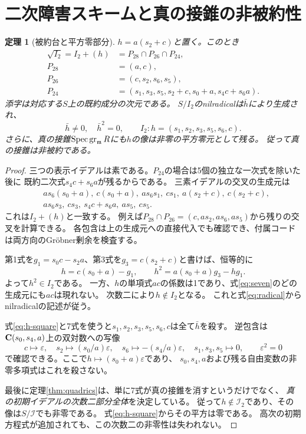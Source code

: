 \documentclass[a4paper,11pt]{ltjsarticle}
\newtheorem{theorem}{定理}[section]
\theoremstyle{remark}\newtheorem{remark}[theorem]{注意}
\newcommand{\Spec}{\operatorname{Spec}}\newcommand{\rank}{\operatorname{rank}}
\begin{document}
\section{二次障害スキームと真の接錐の非被約性}
\begin{theorem}[被約台と平方零部分]\label{thm:radical}
$h=a(s_2+c)$と置く。このとき
\begin{align}
 \sqrt{I_2}=I_2+(h)&=P_{28}\cap P_{26}\cap P_{24},\label{eq:radical}\\
 P_{28}&=(a,c),\nonumber\\
 P_{26}&=(c,s_2,s_6,s_5),\nonumber\\
 P_{24}&=(s_1,s_3,s_5,s_2+c,s_0+a,s_4c+s_6a).\nonumber
\end{align}
添字は対応する$S$上の既約成分の次元である。
$S/I_2$のnilradicalは$\bar h$により生成され、
\begin{equation}\label{eq:nil}
 \bar h\ne0,\quad\bar h^2=0,\qquad
 I_2:h=(s_1,s_2,s_3,s_5,s_6,c).
\end{equation}
さらに、\emph{真の接錐}$\Spec\gr_{\mathfrak m}R$にも$h$の像は非零の平方零元として残る。
従って真の接錐は非被約である。
\end{theorem}
\begin{proof}
三つの表示イデアルは素である。$P_{24}$の場合は5個の独立な一次式を除いた後に
既約二次式$s_4c+s_6a$が残るからである。
三素イデアルの交叉の生成元は
\[
\begin{split}
 &as_6(s_0+a),\ c(s_0+a),\ as_6s_1,\ cs_1,\ a(s_2+c),\ c(s_2+c),\\
 &as_6s_3,\ cs_3,\ s_4c+s_6a,\ as_5,\ cs_5.
\end{split}
\]
これは$I_2+(h)$と一致する。
例えば$P_{28}\cap P_{26}=(c,as_2,as_6,as_5)$から残りの交叉を計算できる。
各包含は上の生成元への直接代入でも確認でき、付属コードは両方向のGr\"obner剰余を検査する。

第1式を$g_1=s_0c-s_2a$、第3式を$g_3=c(s_2+c)$と書けば、恒等的に
\begin{equation}\label{eq:h-square}
 h=c(s_0+a)-g_1,\qquad
 h^2=a(s_0+a)g_3-hg_1.
\end{equation}
よって$h^2\in I_2$である。
一方、$h$の単項式$ac$の係数は1であり、式\eqref{eq:seven}のどの生成元にも$ac$は現れない。
次数二により$h\notin I_2$となる。
これと式\eqref{eq:radical}からnilradicalの記述が従う。

式\eqref{eq:h-square}と7式を使うと$s_1,s_2,s_3,s_5,s_6,c$は全て$\bar h$を殺す。
逆包含は$\mathbf C(s_0,s_4,a)$上の双対数への写像
\[
 c\mapsto\varepsilon,\quad s_2\mapsto(s_0/a)\varepsilon,\quad
 s_6\mapsto-(s_4/a)\varepsilon,\quad s_1,s_3,s_5\mapsto0,
 \qquad\varepsilon^2=0
\]
で確認できる。ここで$h\mapsto(s_0+a)\varepsilon$であり、
$s_0,s_4,a$および残る自由変数の非零多項式はこれを殺さない。

最後に定理\ref{thm:quadrics}は、単に7式が真の接錐を消すというだけでなく、
\emph{真の初期イデアルの次数二部分全体}を決定している。
従って$h\notin\mathcal I_2$であり、その像は$S/\mathcal I$でも非零である。
式\eqref{eq:h-square}からその平方は零である。
高次の初期方程式が追加されても、この次数二の非零性は失われない。
\end{proof}
\end{document}
